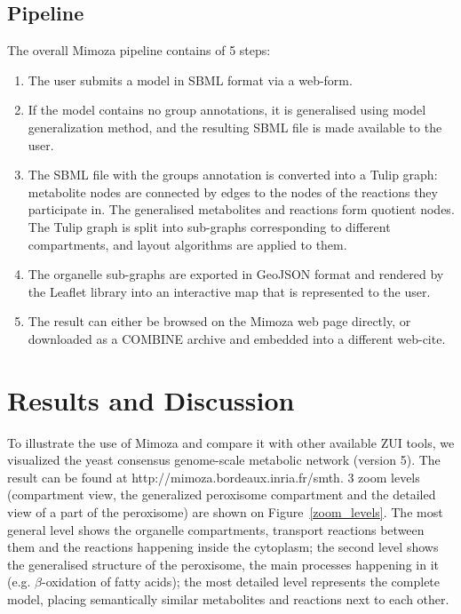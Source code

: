 \documentclass{bmcart}
\begin{document}
 
\subsection*{Pipeline}
The overall Mimoza pipeline  contains of 5 steps:
\begin{enumerate}
\item The user submits a model in SBML format via a web-form.
\item If the model contains no group annotations, it is generalised using model generalization method, and the resulting SBML file is made available to the user.
\item The SBML file with the groups annotation is converted into a Tulip graph: metabolite nodes are connected by edges to the nodes of the reactions they participate in. The generalised metabolites and reactions form quotient nodes. The Tulip graph is split into sub-graphs corresponding to different compartments, and layout algorithms are applied to them.
\item The organelle sub-graphs are exported in GeoJSON format and rendered by the Leaflet library into an interactive map that is represented to the user.
\item The result can either be browsed on the Mimoza web page directly, or downloaded as a COMBINE archive and embedded into a different web-cite.
\end{enumerate}


\section*{Results and Discussion}
To illustrate the use of Mimoza and compare it with other available ZUI tools, we visualized the yeast consensus genome-scale metabolic network (version 5\cite{Heavner12}). The result can be found at http://mimoza.bordeaux.inria.fr/smth. 
3 zoom levels (compartment view, the generalized peroxisome compartment and the detailed view of a part of the peroxisome) are shown on Figure~\ref{zoom_levels}. The most general level shows the organelle compartments, transport reactions between them and the reactions happening inside the cytoplasm; the second level shows the generalised structure of the peroxisome, the main processes happening in it (e.g. $\beta$-oxidation of fatty acids\cite{Metzler01}); the most detailed level represents the complete model, placing semantically similar metabolites and reactions next to each other.
\end{document}
